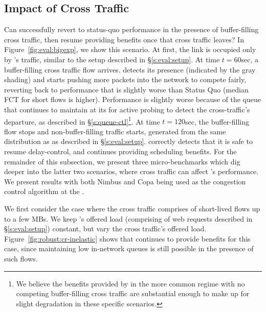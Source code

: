 \subsection{Impact of Cross Traffic}\label{s:robust:cross}



Can \name successfully revert to status-quo performance in the presence of buffer-filling cross traffic, then resume providing benefits once that cross traffic leaves?
In Figure~\ref{fig:eval:bigexp}, we show this scenario.
At first, the link is occupied only by \name's traffic, similar to the setup described in \S\ref{s:eval:setup}.
At time $t=60$sec, a buffer-filling cross traffic flow arrives.
\name detects its presence (indicated by the gray shading) and starts pushing more packets into the network to compete fairly, reverting back to performance that is slightly worse than Status Quo (median FCT for short flows is \bigexpElasticSlowdownWorseness higher). 
Performance is slightly worse because of the  queue that \name continues to maintain at its \inbox for active probing to detect the cross-traffic's departure, as described in \S\ref{s:queue-ctl}\footnote{We believe the benefits provided by \name in the more common regime with no competing buffer-filling cross traffic are substantial enough to make up for slight degradation in these specific scenarios.}. 
At time $t=120$sec, the buffer-filling flow stops and non-buffer-filling traffic starts, generated from the same distribution as \name as described in \S\ref{s:eval:setup}.
\name correctly detects that it is safe to resume delay-control, and continues providing scheduling benefits.
For the remainder of this subsection, we present three micro-benchmarks which dig deeper into the latter two scenarios, where cross traffic can affect \name's performance. 
We present results with both Nimbus and Copa being used as the congestion control algorithm at the \inbox.


 We first consider the case where the cross traffic comprises of short-lived flows up to a few MBs.
We keep \name's offered load (comprising of web requests described in \S\ref{s:eval:setup}) constant, but vary the cross traffic's offered load.
Figure~\ref{fig:robust:cr-inelastic} shows that \name continues to provide benefits for this case, since maintaining low in-network queues is still possible in the presence of such flows.


